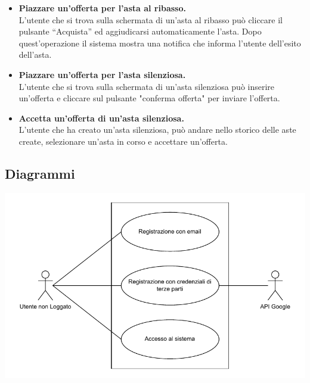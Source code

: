 \begin{itemize}
	\item \textbf{Piazzare un'offerta per l'asta al ribasso.}\\
	      L'utente che si trova sulla schermata di un'asta al ribasso può cliccare il pulsante “Acquista” ed aggiudicarsi automaticamente l'asta. Dopo quest'operazione il sistema mostra una notifica che informa l'utente dell'esito dell'asta.

	\item \textbf{Piazzare un'offerta per l'asta silenziosa.}\\
	      L'utente che si trova sulla schermata di un'asta silenziosa può inserire un'offerta e cliccare sul pulsante "conferma offerta" per inviare l'offerta.

	\item \textbf{Accetta un'offerta di un'asta silenziosa.}\\
	      L'utente che ha creato un'asta silenziosa, può andare nello storico delle aste create, selezionare un'asta in corso e accettare un'offerta.

\end{itemize}

\newpage
\subsection{Diagrammi}
\includegraphics[width=.7\textwidth]{assets/utente_non_loggato_use_case_diagram.pdf}

